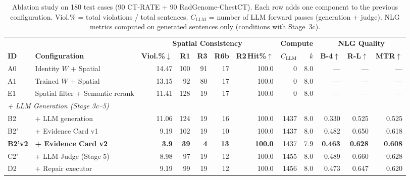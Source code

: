 \begin{table}[t]
\centering
\caption{Ablation study on 180 test cases (90 CT-RATE + 90 RadGenome-ChestCT). Each row adds one component to the previous configuration. Viol.\% = total violations / total sentences. $C_\text{LLM}$ = number of LLM forward passes (generation + judge). NLG metrics computed on generated sentences only (conditions with Stage~3c).}
\label{tab:ablation}
\small
\begin{tabular}{@{}ll rrrrr rr rrr@{}}
\toprule
 & & \multicolumn{5}{c}{\textbf{Spatial Consistency}} & \multicolumn{2}{c}{\textbf{Compute}} & \multicolumn{3}{c}{\textbf{NLG Quality}} \\
\cmidrule(lr){3-7} \cmidrule(lr){8-9} \cmidrule(lr){10-12}
\textbf{ID} & \textbf{Configuration} & \textbf{Viol.\%}$\downarrow$ & \textbf{R1} & \textbf{R3} & \textbf{R6b} & \textbf{R2\,Hit\%}$\uparrow$ & $C_\text{LLM}$ & $k$ & \textbf{B-4}$\uparrow$ & \textbf{R-L}$\uparrow$ & \textbf{MTR}$\uparrow$ \\
\midrule
A0 & Identity $W$ + Spatial & 14.47 & 100 & 91 & 17 & 100.0 & 0 & 8.0 & — & — & — \\
A1 & Trained $W$ + Spatial & 13.15 & 92 & 80 & 17 & 100.0 & 0 & 8.0 & — & — & — \\
E1 & Spatial filter + Semantic rerank & 11.41 & 128 & 19 & 17 & 100.0 & 0 & 8.0 & — & — & — \\
\midrule
\multicolumn{12}{l}{\textit{+ LLM Generation (Stage 3c--5)}} \\
B2 & + LLM generation & 11.06 & 124 & 19 & 16 & 100.0 & 1437 & 8.0 & 0.330 & 0.525 & 0.525 \\
B2' & + Evidence Card v1 & 9.19 & 102 & 19 & 10 & 100.0 & 1437 & 8.0 & 0.482 & 0.650 & 0.618 \\
\textbf{B2'v2} & \textbf{+ Evidence Card v2} & \textbf{3.9} & \textbf{39} & \textbf{4} & \textbf{13} & \textbf{100.0} & 1437 & 7.9 & \textbf{0.463} & \textbf{0.628} & \textbf{0.608} \\
C2' & + LLM Judge (Stage 5) & 8.98 & 97 & 19 & 12 & 100.0 & 1455 & 8.0 & 0.489 & 0.660 & 0.628 \\
D2 & + Repair executor & 9.19 & 99 & 19 & 12 & 100.0 & 1456 & 8.0 & 0.473 & 0.647 & 0.620 \\
\bottomrule
\end{tabular}
\end{table}